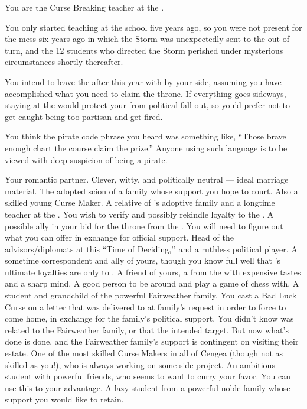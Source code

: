 \documentclass[char]{GL2020}
\begin{document}
\begin{itemz}[Notes]
    \item You are the Curse Breaking teacher at the \pSchool{}.
    \item You only started teaching at the school five years ago, so you were not present for the mess six years ago in which the Storm was unexpectedly sent to the \pShip{} out of turn, and the 12 students who directed the Storm perished under mysterious circumstances shortly thereafter.
    \item You intend to leave the \pSchool{} after this year with \cPirate{} by your side, assuming you have accomplished what you need to claim the throne. If everything goes sideways, staying at the \pSc{} would protect your from political fall out, so you’d prefer not to get caught being too partisan and get fired.
    \item You think the pirate code phrase you heard was something like, ``Those brave enough chart the course claim the prize.'' Anyone using such language is to be viewed with deep suspicion of being a pirate.
\end{itemz}

\begin{contacts}
    \contact{\cPirate{}} Your romantic partner. Clever, witty, and politically neutral — ideal marriage material.
    \contact{\cAdopted{}} The adopted scion of a family whose support you hope to court. Also a skilled young Curse Maker. 
    \contact{\cMusic{}} A relative of \cAdopted{}'s adoptive family and a longtime teacher at the \pSchool{}. You wish to verify and possibly rekindle \cMusic{\their} loyalty to the \pFarm{}.
    \contact{\cAntiChup{}} A possible ally in your bid for the throne from the \pTech{}. You will need to figure out what you can offer \cAntiChup{\them} in exchange for official support.
    \contact{\cEvil{}} Head of the \pFarm{} advisors/diplomats at this ``Time of Deciding,’’ and a ruthless political player. A sometime correspondent and ally of yours, though you know full well that \cEvil{}'s ultimate loyalties are only to \cEvil{\themself}.
    \contact{\cHedonist{}} A friend of yours, a \cHedonist{\cleric} from the \pFarm{} with expensive tastes and a sharp mind. A good person to be around and play a game of chess with.
    \contact{\cInitiate{}} A \pShippie{} student and grandchild of the powerful Fairweather family. You cast a Bad Luck Curse on a letter that was delivered to \cInitiate{} at \cInitiate{\their} family's request in order to force \cInitiate{\them} to come home, in exchange for the family’s political support. You didn’t know \cInitiate{} was related to the Fairweather family, or that \cInitiate{\they \were} the intended target. But now what’s done is done, and the Fairweather family’s support is contingent on \cInitiate{} visiting their estate.
    \contact{\cCurse{}} One of the most skilled Curse Makers in all of Cengea (though not as skilled as you!), who is always working on some side project.
    \contact{\cAmbition{}} An ambitious student with powerful friends, who seems to want to curry your favor. You can use this to your advantage. 
    \contact{\cChupStudent{}} A lazy student from a powerful noble family whose support you would like to retain. 
\end{contacts}
\end{document}
